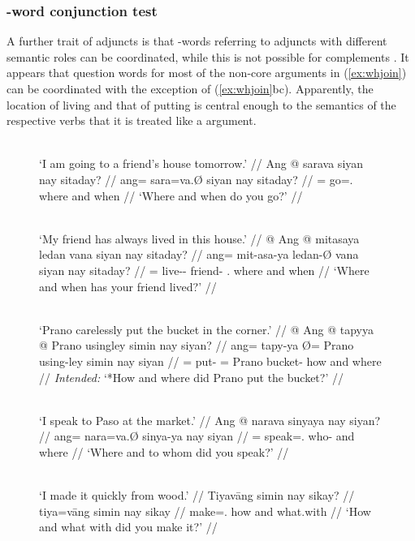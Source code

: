 \subsubsection{-word conjunction test}

A further trait of adjuncts is that -words referring to adjuncts with
different semantic roles can be coordinated, while this is not possible for
complements \citep[408]{needhamtoivonen2011}. It appears that question words
for most of the non-core arguments in (\ref{ex:whjoin}) can be coordinated with
the exception of (\ref{ex:whjoin}bc). Apparently, the location of living and
that of putting is central enough to the semantics of the respective verbs that
it is treated like a  argument.

\begin{figure}
\pex\label{ex:whjoin}
\a\label{ex:whjoin_1}\begingl
	\glpreamble {}\\
		`I am going to a friend's house tomorrow.' //
	\gla Ang @ sarava siyan nay sitaday? //
	\glb ang= sara=va.Ø siyan nay sitaday? //
	\glc \AgtT{}= go=\Second{}.\Top{} where and when //
	\glft `Where and when do you go?' //
\endgl

\a\label{ex:whjoin_2}\begingl
	\glpreamble {}\\
		`My friend has always lived in this house.' //
	\gla * @ Ang @ mitasaya ledan vana siyan nay sitaday? //
	\glb {} ang= mit-asa-ya ledan-Ø vana siyan nay sitaday? //
	\glc {} \AgtT{}= live-\Hab{}-\TsgM{} friend-\Top{} \Second{}.\Gen{} where
		and when //
	\glft `Where and when has your friend lived?' //
\endgl

\a\label{ex:whjoin_3}\begingl
	\glpreamble {}\\
		`Prano carelessly put the bucket in the corner.' //
	\gla * @ Ang @ tapyya {} @ Prano usingley simin nay siyan? //
	\glb {} ang= tapy-ya Ø= Prano using-ley simin nay siyan //
	\glc {} \AgtT{}= put-\TsgM{} \Top{}= Prano bucket-\PargI{} how and where //
	\glft \textit{Intended:} `*How and where did Prano put the bucket?' //
\endgl

\a\label{ex:whjoin_4}\begingl
	\glpreamble {}\\
		`I speak to Paso at the market.' //
	\gla Ang @ narava sinyaya nay siyan? //
	\glb ang= nara=va.Ø sinya-ya nay siyan //
	\glc \AgtT{}= speak=\Second{}.\Top{} who-\Loc{} and where //
	\glft `Where and to whom did you speak?' //
\endgl

\a\label{ex:whjoin_5}\begingl
	\glpreamble {}\\
		`I made it quickly from wood.' //
	\gla Tiyavāng simin nay sikay? //
	\glb tiya=vāng simin nay sikay //
	\glc make=\Second{}.\AgtT{} how and what.with //
	\glft `How and what with did you make it?' //
\endgl

\xe
\end{figure}

